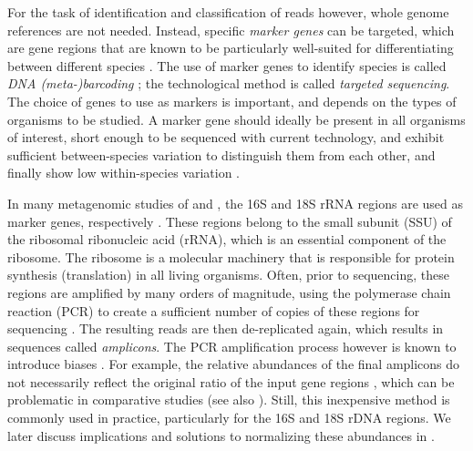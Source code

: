 For the task of identification and classification of reads however, whole genome references are not needed.
Instead, specific \emph{marker genes} can be targeted,
which are gene regions that are known to be
particularly well-suited for differentiating between different species \cite{Ren2016}.
The use of marker genes to identify species is called \emph{DNA (meta-)barcoding} \cite{Hebert2003,Savolainen2005,Deiner2017b};
the technological method is called \emph{targeted sequencing}.
The choice of genes to use as markers is important, and depends on the types of organisms to be studied.
A marker gene should ideally be present in all organisms of interest,
short enough to be sequenced with current technology,
and exhibit sufficient between-species variation to distinguish them from each other,
and finally show low within-species variation \cite{Kress2008}.


In many metagenomic studies of  and ,
the 16S \cite{Weisburg1991} and 18S \cite{Meyer2010} rRNA regions are used as marker genes,
respectively \cite{Woese1977,Woese1990}.
These regions belong to the small subunit (SSU) of the ribosomal ribonucleic acid (rRNA),
which is an essential component of the ribosome.
The ribosome is a molecular machinery that is responsible for protein synthesis (translation) in all living organisms.
Often, prior to sequencing, these regions are amplified by many orders of magnitude,
using the polymerase chain reaction (PCR)
to create a sufficient number of copies of these regions for sequencing \cite{Bartlett2003}.
The resulting reads are then de-replicated again, which results in sequences called \emph{amplicons}.
The PCR amplification process however is known to introduce biases \cite{Logares2014,Brown2017}.
For example, the relative abundances of the final amplicons
do not necessarily reflect the original ratio of the input gene regions \cite{Kanagawa2003,Li2015a},
which can be problematic in comparative studies
(see also ).
Still, this inexpensive method is commonly used in practice, particularly for the 16S and 18S rDNA regions.
We later discuss implications and solutions to normalizing these abundances
in .

